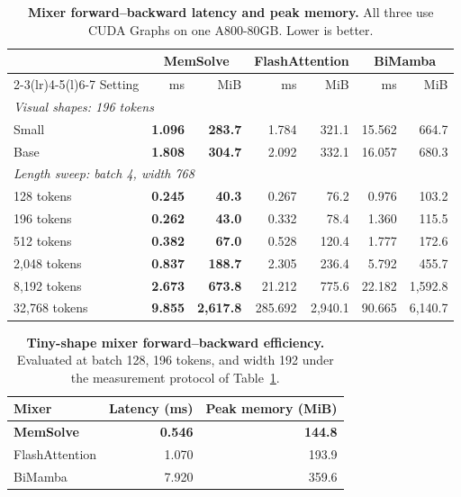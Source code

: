 \documentclass[10pt,twocolumn]{article}
\let\draftsmall\small
\renewcommand{\small}{\draftsmall\fontsize{9}{10}\selectfont}
\begin{document}
\begin{table}[!ht]
\centering
\captionsetup{width=.80\linewidth}
\caption{\textbf{Mixer forward--backward latency and peak memory.} All three use CUDA Graphs on one A800-80GB. Lower is better.}
\label{tab:mixer-efficiency}
\setlength{\tabcolsep}{10pt}
\renewcommand{\arraystretch}{1.03}
\small
\begin{tabular}{lrrrrrr}
\toprule
&\multicolumn{2}{c}{MemSolve}&\multicolumn{2}{c}{FlashAttention}&\multicolumn{2}{c}{BiMamba}\\
\cmidrule(lr){2-3}\cmidrule(lr){4-5}\cmidrule(l){6-7}
Setting &ms &MiB &ms &MiB &ms &MiB\\
\midrule
\multicolumn{7}{l}{\emph{Visual shapes: 196 tokens}}\\
Small &\textbf{1.096} &\textbf{283.7} &1.784 &321.1 &15.562 &664.7\\
Base &\textbf{1.808} &\textbf{304.7} &2.092 &332.1 &16.057 &680.3\\
\midrule
\multicolumn{7}{l}{\emph{Length sweep: batch 4, width 768}}\\
128 tokens &\textbf{0.245} &\textbf{40.3} &0.267 &76.2 &0.976 &103.2\\
196 tokens &\textbf{0.262} &\textbf{43.0} &0.332 &78.4 &1.360 &115.5\\
512 tokens &\textbf{0.382} &\textbf{67.0} &0.528 &120.4 &1.777 &172.6\\
2,048 tokens &\textbf{0.837} &\textbf{188.7} &2.305 &236.4 &5.792 &455.7\\
8,192 tokens &\textbf{2.673} &\textbf{673.8} &21.212 &775.6 &22.182 &1,592.8\\
32,768 tokens &\textbf{9.855} &\textbf{2,617.8} &285.692 &2,940.1 &90.665 &6,140.7\\
\bottomrule
\end{tabular}
\end{table}

\begin{table}[!ht]
\centering
\small
\captionsetup{width=.68\linewidth}
\setlength{\tabcolsep}{12pt}
\renewcommand{\arraystretch}{1.04}
\begin{tabular}{lrr}
\toprule
Mixer & Latency (ms) & Peak memory (MiB)\\
\midrule
\rowcolor{ResultYellow}
\textbf{MemSolve} & \textbf{0.546} & \textbf{144.8}\\
FlashAttention & 1.070 & 193.9\\
BiMamba & 7.920 & 359.6\\
\bottomrule
\end{tabular}
\caption{\textbf{Tiny-shape mixer forward--backward efficiency.}
Evaluated at batch 128, 196 tokens, and width 192 under the measurement
protocol of Table~\ref{tab:mixer-efficiency}.}
\label{tab:mixer-tiny}
\end{table}
\end{document}
